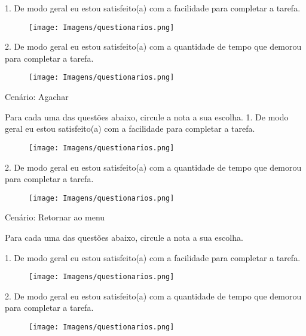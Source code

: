 \begin{flushleft}
1. De modo geral eu estou satisfeito(a) com a facilidade para completar a tarefa.
\begin{figure}[H]	
	\centering
	\texttt{[image: Imagens/questionarios.png]}
	\label{f.questionarios}
\end{figure}
2. De modo geral eu estou satisfeito(a) com a quantidade de tempo que demorou para
completar a tarefa.
\begin{figure}[H]	
	\centering
	\texttt{[image: Imagens/questionarios.png]}
	\label{f.questionarios}
\end{figure}

Cenário: Agachar

Para cada uma das questões abaixo, circule a nota a sua escolha.
1. De modo geral eu estou satisfeito(a) com a facilidade para completar a tarefa.
\begin{figure}[H]	
	\centering
	\texttt{[image: Imagens/questionarios.png]}
	\label{f.questionarios}
\end{figure}

2. De modo geral eu estou satisfeito(a) com a quantidade de tempo que demorou para
completar a tarefa.
\begin{figure}[H]	
	\centering
	\texttt{[image: Imagens/questionarios.png]}
	\label{f.questionarios}
\end{figure}

Cenário: Retornar ao menu

Para cada uma das questões abaixo, circule a nota a sua escolha.

1. De modo geral eu estou satisfeito(a) com a facilidade para completar a tarefa.
\begin{figure}[H]	
	\centering
	\texttt{[image: Imagens/questionarios.png]}
	\label{f.questionarios}
\end{figure}

2. De modo geral eu estou satisfeito(a) com a quantidade de tempo que demorou para
completar a tarefa.
\begin{figure}[H]	
	\centering
	\texttt{[image: Imagens/questionarios.png]}
	\label{f.questionarios}
\end{figure}


\end{flushleft}